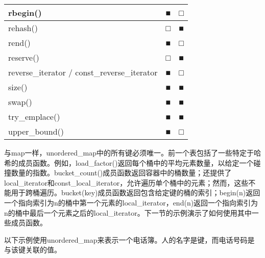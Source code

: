\begin{longtable}{|l|l|l|}
rbegin()                                     & ■            & □                       \\ \hline
rehash()                                     & □            & ■                       \\ \hline
rend()                                       & ■            & □                       \\ \hline
reserve()                                    & □            & ■                       \\ \hline
reverse\_iterator / const\_reverse\_iterator & ■            & □                       \\ \hline
size()                                       & ■            & ■                       \\ \hline
swap()                                       & ■            & ■                       \\ \hline
try\_emplace()                               & ■            & ■                       \\ \hline
upper\_bound()                               & ■            & □                       \\ \hline
\end{longtable}

与map一样，unordered\_map中的所有键必须唯一。前一个表包括了一些特定于哈希的成员函数。例如，load\_factor()返回每个桶中的平均元素数量，以给定一个碰撞数量的指数。bucket\_count()成员函数返回容器中的桶数量；还提供了local\_iterator和const\_local\_iterator，允许遍历单个桶中的元素；然而，这些不能用于跨桶遍历。bucket(key)成员函数返回包含给定键的桶的索引；begin(n)返回一个指向索引为n的桶中第一个元素的local\_iterator，end(n)返回一个指向索引为n的桶中最后一个元素之后的local\_iterator。下一节的示例演示了如何使用其中一些成员函数。


以下示例使用unordered\_map来表示一个电话簿。人的名字是键，而电话号码是与该键关联的值。

